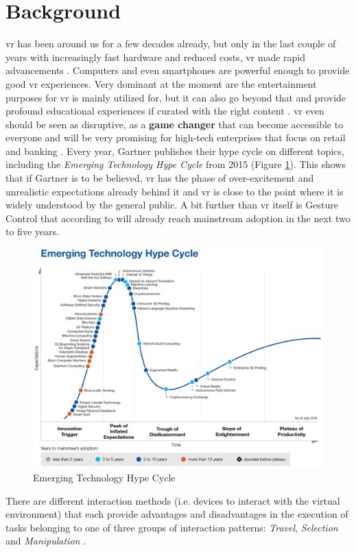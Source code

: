 \section{Background}

\gls{vr} has been around us for a few decades already, but only in the last couple of years with increasingly fast hardware and reduced costs, \gls{vr} made rapid advancements \citep{vrs2015}. Computers and even smartphones are powerful enough to provide good \gls{vr} experiences.\newline
Very dominant at the moment are the entertainment purposes for \gls{vr} is mainly utilized for, but it can also go beyond that and provide profound educational experiences if curated with the right content \citep{Safrudin2015}. \gls{vr} even should be seen as disruptive, as a \textbf{game changer} that can become accessible to everyone and will be very promising for high-tech enterprises that focus on retail and banking \citep{Safrudin2015}. \newline
Every year, Gartner publishes their hype cycle on different topics, including the \textit{Emerging Technology Hype Cycle} from 2015 (Figure \ref{fig:hypecycle}). This shows that if Gartner is to be believed, \gls{vr} has the phase of over-excitement and unrealistic expectations already behind it and \gls{vr} is close to the point where it is widely understood by the general public. A bit further than \gls{vr} itself is Gesture Control that according to \cite{Gartner2015} will already reach mainstream adoption in the next two to five years.
\begin{figure}[h]
	\begin{center}
		\includegraphics[width=14cm]{03_Figures/03_Gartner/Gartner_EmergingTech2015.png}
		\caption[Emerging Technology Hype Cycle]{Emerging Technology Hype Cycle \citep{Gartner2015b}}
		\label{fig:hypecycle}
	\end{center}
\end{figure}
There are different interaction methods (i.e. devices to interact with the virtual environment) that each provide advantages and disadvantages in the execution of tasks belonging to one of three groups of interaction patterns: \textit{Travel}, \textit{Selection} and \textit{Manipulation} \citep{Bowman2002}. 


